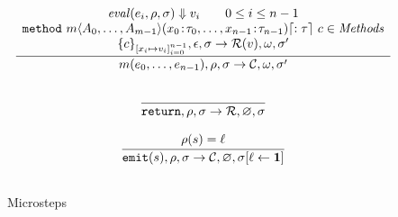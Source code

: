 \begin{figure}
$$\begin{array}{c}
      \cfrac{
      \begin{array}{c}
        \eval{e_i}{\env}{\heap} \Downarrow v_i \qquad 0\leq i \leq n-1                                                                                 \\
        {\tt{method}}~m\langle A_0,\ldots,A_{m-1}\rangle(\field{x_0}{\tau_0},\ldots,\field{x_{n-1}}{\tau_{n-1}})\lceil :\tau\rceil~c \in {\mathit{Methods}} \\
        \{c\}_{[x_i \mapsto v_i]_{i=0}^{n-1}},\epsilon, \heap \rightarrow \ret(v), \omega, \heap'
      \end{array}
      }{
      m(e_0,\ldots,e_{n-1}), \env, \heap \rightarrow \continue, \omega, \heap'
      }
      \\\\
      \cfrac{

      }{
        \return,\env,\heap \rightarrow \mathcal{R},\varnothing,\heap
      }
      \\\\
      \cfrac{
        \rho(s) = \ell  
      }{
        \emit(s),\env,\heap \rightarrow \mathcal{C},\varnothing,\heap[\ell \leftarrow \present]
      }
      \\\\
    \end{array}
  $$
  \caption{Microsteps}
  \label{fig:sem2}
\end{figure}
